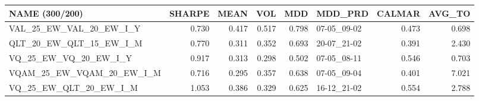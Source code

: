 \begin{tabular}{lrrrrlrr}
\toprule
NAME (300/200) & SHARPE & MEAN & VOL & MDD & MDD\_PRD & CALMAR & AVG\_TO \\
\midrule
VAL\_25\_EW\_VAL\_20\_EW\_I\_Y & 0.730 & 0.417 & 0.517 & 0.798 & 07-05\_09-02 & 0.473 & 0.698 \\
QLT\_20\_EW\_QLT\_15\_EW\_I\_M & 0.770 & 0.311 & 0.352 & 0.693 & 20-07\_21-02 & 0.391 & 2.430 \\
VQ\_25\_EW\_VQ\_20\_EW\_I\_Y & 0.917 & 0.313 & 0.298 & 0.502 & 07-05\_08-11 & 0.546 & 0.703 \\
VQAM\_25\_EW\_VQAM\_20\_EW\_I\_M & 0.716 & 0.295 & 0.357 & 0.638 & 07-05\_09-04 & 0.401 & 7.021 \\
VQ\_25\_EW\_QLT\_20\_EW\_I\_M & 1.053 & 0.386 & 0.329 & 0.625 & 16-12\_21-02 & 0.554 & 2.788 \\
\bottomrule
\end{tabular}
